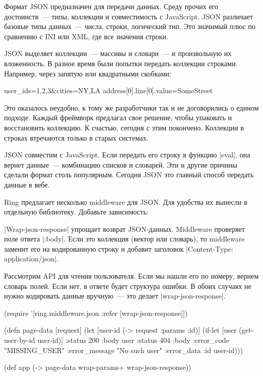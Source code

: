 Формат JSON предназначен для передачи данных. Среду прочих его достоинств~---
типы, коллекции и совместимость с JavaScript. JSON различает базовые типы
данных~--- числа, строки, логический тип. Это значимый плюс по сравнению с INI
или XML, где все значения строки.

JSON выделяет коллекции~--- массивы и словари~--- и произвольную их
вложенность. В разное время были попытки передать коллекции строками. Например,
через запятую или квадратными скобками:

\begin{english}
  \begin{text}
user_ids=1,2,3&cities=NY,LA
address[0].line[0].value=SomeStreet
  \end{text}
\end{english}

\noindent
Это оказалось неудобно, к тому же разработчики так и не договорились о едином
подходе. Каждый фреймворк предлагал свое решение, чтобы упаковать и восстановить
коллекцию. К счастью, сегодня с этим покончено. Коллекции в строках втречаются
только в старых системах.

JSON совместим с JavaScript. Если передать его строку в функцию \spverb|eval|,
она вернет данные~--- комбинацию списков и словарей. Эти и другие причины
сделали формат столь популярным. Сегодня JSON это главный способ передать данные
в вебе.

Ring предлагает несколько middleware для JSON. Для удобства их вынесли в
отдельную библиотеку. Добавьте зависимость:

\begin{english}
  \begin{clojure}
  \end{clojure}
\end{english}

\spverb|Wrap-json-response| упрощает возврат JSON-данных. Middleware проверяет
поле ответа \spverb|:body|. Если это коллекция (вектор или словарь), то
middleware заменит его на кодированную строку и добавит заголовок
\spverb|Content-Type: application/json|.

Рассмотрим API для чтения пользователя. Если мы нашли его по номеру, вернем
словарь полей. Если нет, в ответе будет структура ошибки. В обоих случаях не
нужно кодировать данные вручную~--- это делает \spverb|wrap-json-response|.

\begin{english}
  \begin{clojure}
(require '[ring.middleware.json
           :refer [wrap-json-response]])

(defn page-data [request]
  (let [user-id (-> request :params :id)]
    (if-let [user (get-user-by-id user-id)]
      {:status 200 :body user}
      {:status 404
       :body {:error_code "MISSING_USER"
              :error_message "No such user"
              :error_data {:id user-id}}})))

(def app (-> page-data
             wrap-params+
             wrap-json-response))
  \end{clojure}
\end{english}

